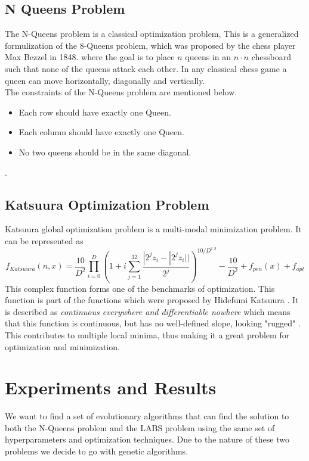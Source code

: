 \documentclass{article}
\begin{document}
\subsection{N Queens Problem}\label{sec:nqueens}
The N-Queens problem is a classical optimization problem, This is a generalized formulization of the 8-Queens problem, which was proposed by the chess player Max Bezzel in 1848. where the goal is to place $n$ queens in an $n \cdot n$ chessboard such that none of the queens attack each other. In any classical chess game a queen can move horizontally, diagonally and vertically. \\ 
The constraints of the N-Queens problem are mentioned below.  \cite{n_queens}
\begin{itemize}
    \item Each row should have exactly one Queen. 
    \item Each column should have exactly one Queen.
    \item No two queens should be in the same diagonal.
\end{itemize}. 

\subsection{Katsuura Optimization Problem} \label{sec:katsuura}
Katsuura global optimization problem is a multi-modal minimization problem. It can be represented as \cite{katsuura-source}
\begin{equation*}
     f_{Katsuura}(n, x) = \frac{10}{D^2} \prod_{i=0}^{D} \left ( 1 + i \sum_{j=1}^{32} \frac{|2^jz_i- |2^j z_i||}{2^j} \right )^{10/D^{1.2}}-\frac{10}{D^2} + f_{pen}(x) + f_{opt}
\end{equation*}
This complex function forms one of the benchmarks of optimization. This function is part of the functions which were proposed by Hidefumi Katsuura \cite{katsuura-actualpaper}. It is described as \textit{continuous everywhere and differentiable nowhere} which means that this function is continuous, but has no well-defined slope, looking "rugged" \cite{rugged-boi}. This contributes to multiple local minima, thus making it a great problem for optimization and minimization. 

\section{Experiments and Results} \label{sec:exp-results}
We want to find a set of evolutionary algorithms that can find the solution to both the N-Queens problem and the LABS problem using the same set of hyperparameters and optimization techniques. Due to the nature of these two problems we decide to go with genetic algorithms.  
\end{document}
